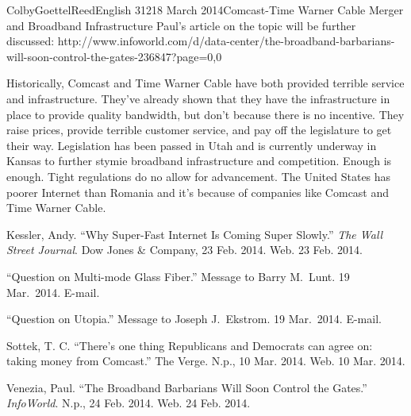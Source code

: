\documentclass[12pt]{article}
\begin{document}
\begin{mla}{Colby}{Goettel}{Reed}{English 312}{18 March 2014}{Comcast-Time Warner Cable Merger and Broadband Infrastructure}
Paul's article on the topic will be further discussed: http://www.infoworld.com/d/data-center/the-broadband-barbarians-will-soon-control-the-gates-236847?page=0,0

Historically, Comcast and Time Warner Cable have both provided terrible service and infrastructure. They've already shown that they have the infrastructure in place to provide quality bandwidth, but don't because there is no incentive. They raise prices, provide terrible customer service, and pay off the legislature to get their way. Legislation has been passed in Utah and is currently underway in Kansas to further stymie broadband infrastructure and competition. Enough is enough. Tight regulations do no allow for advancement. The United States has poorer Internet than Romania and it's because of companies like Comcast and Time Warner Cable.

\begin{workscited}
    \bibent Kessler, Andy. ``Why Super-Fast Internet Is Coming Super Slowly.'' \textit{The Wall Street Journal}. Dow Jones \& Company, 23 Feb. 2014. Web. 23 Feb. 2014.
    
    \bibent ``Question on Multi-mode Glass Fiber.'' Message to Barry M.\ Lunt. 19 Mar.\ 2014. E-mail.
    
    \bibent ``Question on Utopia.'' Message to Joseph J.\ Ekstrom. 19 Mar.\ 2014. E-mail.
    
    \bibent Sottek, T. C. ``There's one thing Republicans and Democrats can agree on: taking money from Comcast.'' The Verge. N.p., 10 Mar. 2014. Web. 10 Mar. 2014.
    
    \bibent Venezia, Paul. ``The Broadband Barbarians Will Soon Control the Gates.'' \textit{InfoWorld}. N.p., 24 Feb. 2014. Web. 24 Feb. 2014.
\end{workscited}

\end{mla}
\end{document}
